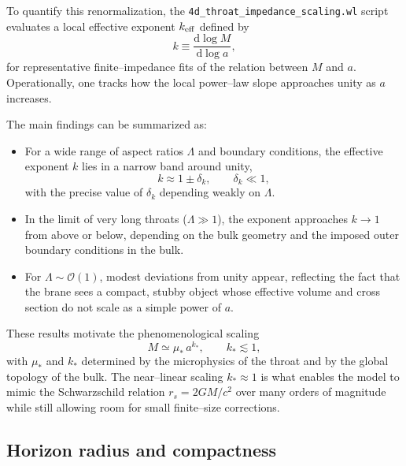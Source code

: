 \documentclass[11pt]{article}
\begin{document}
To quantify this renormalization, the \texttt{4d\_throat\_impedance\_scaling.wl}
script evaluates a local effective exponent \(k_{\rm eff}\) defined by
\begin{equation}
  k
  \equiv \frac{\mathrm{d}\log M}{\mathrm{d}\log a},
  \label{eq:k-def}
\end{equation}
for representative finite--impedance fits of the relation between
\(M\) and \(a\).  Operationally, one tracks how the local power--law slope
approaches unity as \(a\) increases.

The main findings can be summarized as:
\begin{itemize}
  \item For a wide range of aspect ratios \(\Lambda\) and boundary
        conditions, the effective exponent \(k\) lies in a narrow band
        around unity,
        \begin{equation}
          k \approx 1 \pm \delta_k,
          \qquad
          \delta_k \ll 1,
        \end{equation}
        with the precise value of \(\delta_k\) depending weakly on
        \(\Lambda\).
  \item In the limit of very long throats (\(\Lambda \gg 1\)), the exponent
        approaches \(k \to 1\) from above or below, depending on the bulk
        geometry and the imposed outer boundary conditions in the bulk.
  \item For \(\Lambda \sim \mathcal{O}(1)\), modest deviations from unity
        appear, reflecting the fact that the brane sees a compact, stubby
        object whose effective volume and cross section do not scale as a
        simple power of \(a\).
\end{itemize}

These results motivate the phenomenological scaling
\begin{equation}
  M
  \simeq \mu_*\,a^{k_*},
  \qquad
  k_* \lesssim 1,
  \label{eq:M-a-kstar}
\end{equation}
with \(\mu_*\) and \(k_*\) determined by the microphysics of the throat and
by the global topology of the bulk.  The near--linear scaling
\(k_* \approx 1\) is what enables the model to mimic the Schwarzschild
relation \(r_s = 2 G M / c^2\) over many orders of magnitude while still
allowing room for small finite--size corrections.

\subsection{Horizon radius and compactness}
\label{app:impedance-horizon-scaling}
\end{document}
